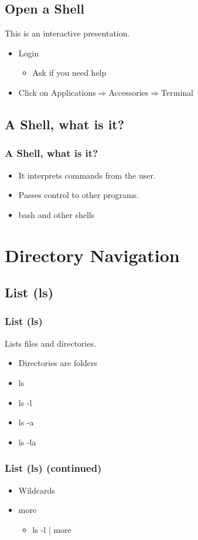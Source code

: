 \documentclass[hyperref={pdfpagelabels=false}]{beamer}
\begin{document}
\subsection{Open a Shell}
\frame
{
    This is an interactive presentation.
    \begin{itemize}
    \item{Login}
        \begin{itemize}
        \item{Ask if you need help}
        \end{itemize}
    \item{ Click on Applications$\Rightarrow$Accessories$\Rightarrow$Terminal}
    \end{itemize}
   
}
\subsection{A Shell, what is it?}
\frame
{
    \frametitle{A Shell, what is it?}
    \begin{itemize}
    \item{It interprets commands from the user.}
    \item{Passes control to other programs.}
    \item{bash and other shells}
    \end{itemize}
}
\section{Directory Navigation}
\subsection{List (ls)}
\frame
{
    \frametitle{List (ls)}
    Lists files and directories.
    \begin{itemize}
    \item{Directories are folders}
    \end{itemize}
    \begin{itemize}
    \item{ls}
    \item{ls -l}
    \item{ls -a}
    \item{ls -la}
    \end{itemize}
}
\frame
{
    \frametitle{List (ls) (continued)}
    \begin{itemize}
    \item{Wildcards}
    \item{more}
        \begin{itemize}    
        \item{ls -l | more}
        \end{itemize}
    \end{itemize}
}
\end{document}
